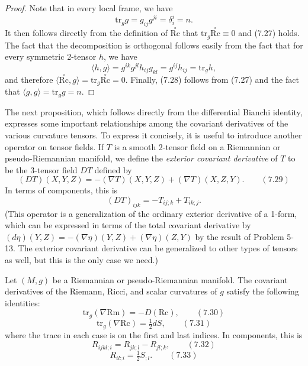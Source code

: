 \begin{proof}
Note that in every local frame, we have
\[
\text{tr}_g g = g_{ij} g^{ji} = \delta_i^i = n.
\]
It then follows directly from the definition of $\stackrel{\circ}{\text{Rc}}$ that $\text{tr}_g \stackrel{\circ}{\text{Rc}} \equiv 0$ and (7.27) holds. The fact that the decomposition is orthogonal follows easily from the fact that for every symmetric 2-tensor $h$, we have
\[
\langle h,g \rangle = g^{ik}g^{jl}h_{ij}g_{kl} = g^{ij}h_{ij} = \mathrm{tr}_g h,
\]
and therefore $\langle \overset{\circ}{\mathrm{Rc}}, g \rangle = \mathrm{tr}_g \overset{\circ}{\mathrm{Rc}} = 0$. Finally, (7.28) follows from (7.27) and the fact that $\langle g, g \rangle = \mathrm{tr}_g g = n$.
\end{proof}

The next proposition, which follows directly from the differential Bianchi identity, expresses some important relationships among the covariant derivatives of the various curvature tensors. To express it concisely, it is useful to introduce another operator on tensor fields. If $T$ is a smooth 2-tensor field on a Riemannian or pseudo-Riemannian manifold, we define the \emph{exterior covariant derivative} of $T$ to be the 3-tensor field $DT$ defined by
$$(DT)(X,Y,Z) = -(\nabla T)(X,Y,Z) + (\nabla T)(X,Z,Y). \qquad (7.29)$$
In terms of components, this is
$$(DT)_{ijk} = -T_{ij;k} + T_{ik;j}.$$
(This operator is a generalization of the ordinary exterior derivative of a 1-form, which can be expressed in terms of the total covariant derivative by $(d\eta)(Y, Z) = -(\nabla \eta)(Y,Z) + (\nabla \eta)(Z,Y)$ by the result of Problem 5-13. The exterior covariant derivative can be generalized to other types of tensors as well, but this is the only case we need.)

\begin{proposition}
\label{prop:contracted-bianchi-identities}
Let $(M, g)$ be a Riemannian or pseudo-Riemannian manifold. The covariant derivatives of the Riemann, Ricci, and scalar curvatures of $g$ satisfy the following identities:
$$\mathrm{tr}_g (\nabla \mathrm{Rm}) = -D(\mathrm{Rc}), \qquad (7.30)$$
$$\mathrm{tr}_g (\nabla \mathrm{Rc}) = \tfrac{1}{2}dS, \qquad (7.31)$$
where the trace in each case is on the first and last indices. In components, this is
$$R_{ijkl;i} = R_{jk;l} - R_{jl;k}, \qquad (7.32)$$
$$R_{il;i} = \tfrac{1}{2}S_{;l}. \qquad (7.33)$$
\end{proposition}


